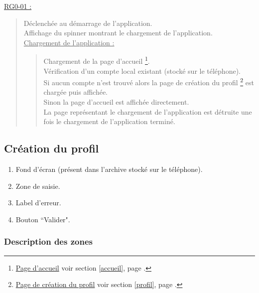 \documentclass{report}
\begin{document}
		\underline{RG0-01 :}
		\begin{quote}
			Déclenchée au démarrage de l'application.\\
			Affichage du spinner montrant le chargement de l'application.\\
			\underline{Chargement de l'application :}
				\begin{quote}
					Chargement de la page d'accueil%
					\footnote[1]{
						\hyperlink{Page d'accueil}{Page d'accueil}
						\og voir section \ref{accueil}, page \pageref{accueil}.\fg
					}.\\
					Vérification d'un compte local existant (stocké sur le téléphone).\\
					Si aucun compte n'est trouvé alors la page de création du profil%
					\footnote[2]{
						\hyperlink{Création du profil}{Page de création du profil}
						\og voir section \ref{profil}, page \pageref{profil}.\fg
					}
					est chargée puis affichée.\\
					Sinon la page d'accueil%
					\footnotemark[1]
					est affichée directement. \\
					La page représentant le chargement de l'application est détruite une fois le chargement de l'application terminé.\\
				\end{quote}
		\end{quote}

	
\newpage

	\subsection{Création du profil}
		\hypertarget{profil}{}
		\label{profil}

		\begin{center}
			
		\end{center}

		\begin{enumerate}
		  \item Fond d'écran (présent dans l'archive stocké sur le téléphone).
		  \item Zone de saisie.
		  \item Label d'erreur.
		  \item Bouton ``Valider".
		\end{enumerate}

		\subsubsection{Description des zones}
				
\end{document}
